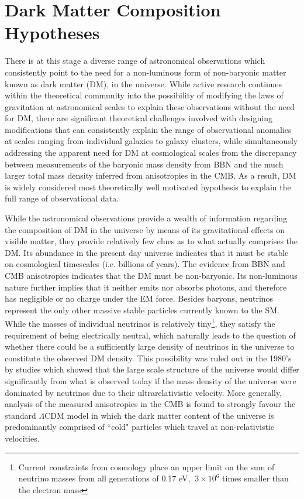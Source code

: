 \section{Dark Matter Composition Hypotheses}

There is at this stage a diverse range of astronomical observations which consistently point to the need for a non-luminous form of non-baryonic matter known as dark matter (DM), in the universe. While active research continues within the theoretical community \cite{mond_2012, mond_2021} into the possibility of modifying the laws of gravitation at astronomical scales to explain these observations without the need for DM, there are significant theoretical challenges involved with designing modifications that can consistently explain the range of observational anomalies at scales ranging from individual galaxies to galaxy clusters, while simultaneously addressing the apparent need for DM at cosmological scales from the discrepancy between measurements of the baryonic mass density from BBN and the much larger total mass density inferred from anisotropies in the CMB. As a result, DM is widely considered most theoretically well motivated hypothesis to explain the full range of observational data.

While the astronomical observations provide a wealth of information regarding the composition of DM in the universe by means of its gravitational effects on visible matter, they provide relatively few clues as to what actually comprises the DM. Its abundance in the present day universe indicates that it must be stable on cosmological timescales (i.e. billions of years). The evidence from BBN and CMB anisotropies indicates that the DM must be non-baryonic. Its non-luminous nature further implies that it neither emits nor absorbs photons, and therefore has negligible or no charge under the EM force. Besides baryons, neutrinos represent the only other massive stable particles currently known to the SM. While the masses of individual neutrinos is relatively tiny\footnote{Current constraints from cosmology place an upper limit on the sum of neutrino masses from all generations of 0.17 eV, \(~3\times10^6\) times smaller than the electron mass}, they satisfy the requirement of being electrically neutral, which naturally leads to the question of whether there could be a sufficiently large density of neutrinos in the universe to constitute the observed DM density. This possibility was ruled out in the 1980's by studies \cite{neutrino_dm} which showed that the large scale structure of the universe would differ significantly from what is observed today if the mass density of the universe were dominated by neutrinos due to their ultrarelativistic velocity. More generally, analysis of the measured anisotropies in the CMB \cite{Planck_2020} is found to strongly favour the standard \(\Lambda\)CDM model in which the dark matter content of the universe is predominantly comprised of ``cold" particles which travel at non-relativistic velocities.

